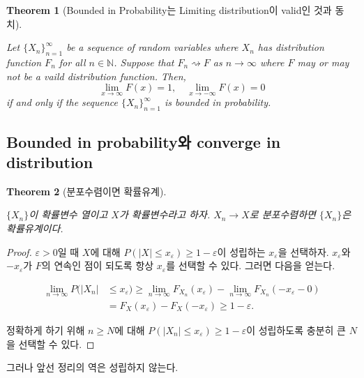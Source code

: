 \documentclass[
  letterpaper,
  DIV=11,
  numbers=noendperiod]{scrreprt}
\theoremstyle{plain}
\newtheorem{theorem}{Theorem}[chapter]
\theoremstyle{definition}
\theoremstyle{definition}
\theoremstyle{plain}
\theoremstyle{plain}
\theoremstyle{remark}
\begin{document}
\begin{theorem}[Bounded in Probability는 Limiting distribution이 valid인
것과 동치]\protect\hypertarget{thm-validbip}{}\label{thm-validbip}

Let \(\{X_n\}_{n=1}^{\infty}\) be a sequence of random variables where
\(X_n\) has distribution function \(F_n\) for all \(n\in \mathbb{N}\).
Suppose that \(F_n \rightsquigarrow F\) as \(n\rightarrow \infty\) where
\(F\) may or may not be a vaild distribution function. Then, \[
\lim_{x\rightarrow \infty} F(x) = 1, \quad{} \lim_{x\rightarrow -\infty} F(x) = 0
\] if and only if the sequence \(\{X_n \}_{n=1}^{\infty}\) is bounded in
probability.

\end{theorem}

\subsection{Bounded in probability와 converge in
distribution}\label{bounded-in-probabilityuxc640-converge-in-distribution}

\begin{theorem}[분포수렴이면
확률유계]\protect\hypertarget{thm-convdbp}{}\label{thm-convdbp}

\(\{X_n\}\)이 확률변수 열이고 \(X\)가 확률변수라고 하자.
\(X_n \rightarrow X\)로 분포수렴하면 \(\{X_n\}\)은 확률유계이다.

\end{theorem}

\begin{proof}
\(\varepsilon>0\)일 때 \(X\)에 대해
\(P(|X|\leq x_{\varepsilon})\geq 1-\varepsilon\)이 성립하는
\(x_{\varepsilon}\)을 선택하자. \(x_{\varepsilon}\)와
\(-x_{\varepsilon}\)가 \(F\)의 연속인 점이 되도록 항상
\(x_{\varepsilon}\)를 선택할 수 있다. 그러면 다음을 얻는다.

\begin{align*}
\lim_{n\rightarrow \infty}P(|X_n|&\leq x_{\varepsilon})\geq \lim_{n\rightarrow\infty}F_{X_n}(x_{\varepsilon}) - \lim_{n\rightarrow\infty}F_{X_n}(-x_{\varepsilon}-0)\\
&= F_{X}(x_{\varepsilon})-F_X(-x_{\varepsilon})\geq 1-\varepsilon.
\end{align*}

정확하게 하기 위해 \(n\geq N\)에 대해
\(P(|X_n| \leq x_{\varepsilon})\geq 1-\varepsilon\)이 성립하도록 충분히
큰 \(N\)을 선택할 수 있다.
\end{proof}

그러나 앞선 정리의 역은 성립하지 않는다.
\end{document}
